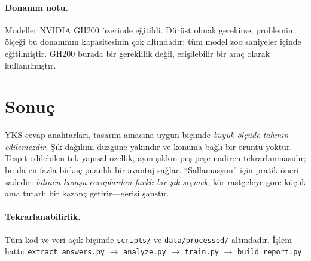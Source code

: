 \documentclass[11pt]{article}
\begin{document}
\paragraph{Donanım notu.} Modeller NVIDIA GH200 üzerinde eğitildi. Dürüst
olmak gerekirse, problemin ölçeği bu donanımın kapasitesinin çok altındadır;
tüm model zoo saniyeler içinde eğitilmiştir. GH200 burada bir gereklilik
değil, erişilebilir bir araç olarak kullanılmıştır.

\section{Sonuç}
YKS cevap anahtarları, tasarım amacına uygun biçimde \emph{büyük ölçüde
tahmin edilemezdir}. Şık dağılımı düzgüne yakındır ve konuma bağlı bir
örüntü yoktur. Tespit edilebilen tek yapısal özellik, aynı şıkkın peş peşe
nadiren tekrarlanmasıdır; bu da en fazla birkaç puanlık bir avantaj sağlar.
``Sallamasyon'' için pratik öneri sadedir: \emph{bilinen komşu cevaplardan
farklı bir şık seçmek}, kör rastgeleye göre küçük ama tutarlı bir kazanç
getirir---gerisi şanstır.

\paragraph{Tekrarlanabilirlik.} Tüm kod ve veri açık biçimde
\texttt{scripts/} ve \texttt{data/processed/} altındadır. İşlem hattı:
\texttt{extract\_answers.py} $\rightarrow$ \texttt{analyze.py}
$\rightarrow$ \texttt{train.py} $\rightarrow$ \texttt{build\_report.py}.
\end{document}
